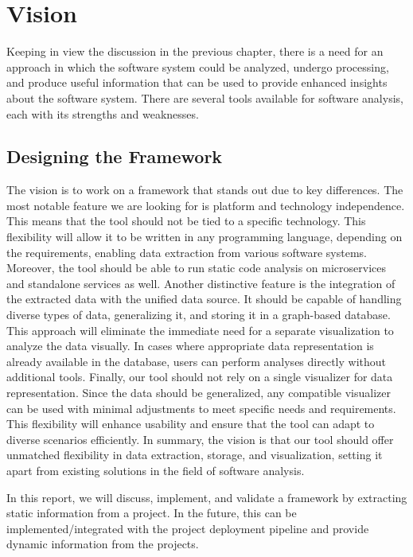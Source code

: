 \section{Vision}\label{sec:vision}

Keeping in view the discussion in the previous chapter, there is a need for an approach in which the software system could be analyzed, undergo processing, and produce useful information that can be used to provide enhanced insights about the software system. There are several tools available for software analysis, each with its strengths and weaknesses. 

\subsection{Designing the Framework}
The vision is to work on a framework that stands out due to key differences. The most notable feature we are looking for is platform and technology independence. This means that the tool should not be tied to a specific technology. This flexibility will allow it to be written in any programming language, depending on the requirements, enabling data extraction from various software systems. Moreover, the tool should be able to run static code analysis on microservices and standalone services as well. Another distinctive feature is the integration of the extracted data with the unified data source. It should be capable of handling diverse types of data, generalizing it, and storing it in a graph-based database. This approach will eliminate the immediate need for a separate visualization to analyze the data visually. In cases where appropriate data representation is already available in the database, users can perform analyses directly without additional tools. Finally, our tool should not rely on a single visualizer for data representation. Since the data should be generalized, any compatible visualizer can be used with minimal adjustments to meet specific needs and requirements. This flexibility will enhance usability and ensure that the tool can adapt to diverse scenarios efficiently. In summary, the vision is that our tool should offer unmatched flexibility in data extraction, storage, and visualization, setting it apart from existing solutions in the field of software analysis.

In this report, we will discuss, implement, and validate a framework by extracting static information from a project. In the future, this can be implemented/integrated with the project deployment pipeline and provide dynamic information from the projects.

